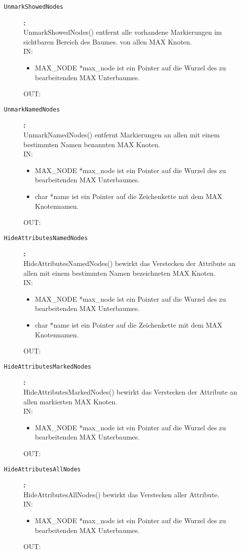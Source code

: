 \begin{description}
\item[\tt UnmarkShowedNodes]{\bf :\\}
UnmarkShowedNodes() entfernt alle vorhandene Markierungen im sichtbaren Bereich des Baumes. von allen MAX Knoten. \\
IN:
\begin{itemize}
   \item MAX\_NODE *max\_node ist ein Pointer auf die Wurzel des zu bearbeitenden MAX Unterbaumes.
\end{itemize}
OUT:

\item[\tt UnmarkNamedNodes]{\bf :\\}
UnmarkNamedNodes() entfernt Markierungen an allen mit einem bestimmten Namen benannten MAX Knoten. \\
IN:
\begin{itemize}
   \item MAX\_NODE *max\_node ist ein Pointer auf die Wurzel des zu bearbeitenden MAX Unterbaumes.
   \item char *name ist ein Pointer auf die Zeichenkette mit dem MAX Knotennamen.
\end{itemize}
OUT:

\item[\tt HideAttributesNamedNodes]{\bf :\\}
HideAttributesNamedNodes() bewirkt das Verstecken der Attribute an allen mit einem bestimmten Namen bezeichneten MAX Knoten. \\
IN:
\begin{itemize}
   \item MAX\_NODE *max\_node ist ein Pointer auf die Wurzel des zu bearbeitenden MAX Unterbaumes.
   \item char *name ist ein Pointer auf die Zeichenkette mit dem MAX Knotennamen.
\end{itemize}
OUT:

\item[\tt HideAttributesMarkedNodes]{\bf :\\}
HideAttributesMarkedNodes() bewirkt das Verstecken der Attribute an allen markierten MAX Knoten. \\
IN:
\begin{itemize}
   \item MAX\_NODE *max\_node ist ein Pointer auf die Wurzel des zu bearbeitenden MAX Unterbaumes.
\end{itemize}
OUT:

\item[\tt HideAttributesAllNodes]{\bf :\\}
HideAttributesAllNodes() bewirkt das Verstecken aller Attribute. \\
IN:
\begin{itemize}
   \item MAX\_NODE *max\_node ist ein Pointer auf die Wurzel des zu bearbeitenden MAX Unterbaumes.
\end{itemize}
OUT:


\end{description}
